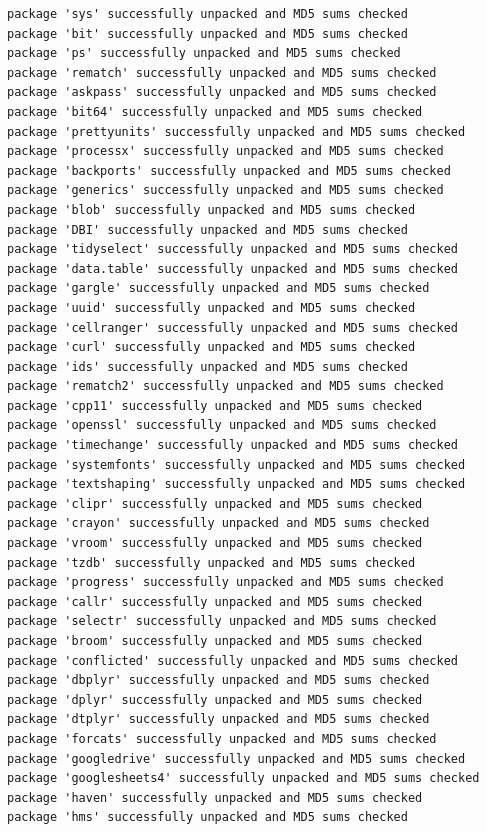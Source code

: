 \documentclass[
  11pt,
]{article}
\begin{document}
\begin{verbatim}
package 'sys' successfully unpacked and MD5 sums checked
package 'bit' successfully unpacked and MD5 sums checked
package 'ps' successfully unpacked and MD5 sums checked
package 'rematch' successfully unpacked and MD5 sums checked
package 'askpass' successfully unpacked and MD5 sums checked
package 'bit64' successfully unpacked and MD5 sums checked
package 'prettyunits' successfully unpacked and MD5 sums checked
package 'processx' successfully unpacked and MD5 sums checked
package 'backports' successfully unpacked and MD5 sums checked
package 'generics' successfully unpacked and MD5 sums checked
package 'blob' successfully unpacked and MD5 sums checked
package 'DBI' successfully unpacked and MD5 sums checked
package 'tidyselect' successfully unpacked and MD5 sums checked
package 'data.table' successfully unpacked and MD5 sums checked
package 'gargle' successfully unpacked and MD5 sums checked
package 'uuid' successfully unpacked and MD5 sums checked
package 'cellranger' successfully unpacked and MD5 sums checked
package 'curl' successfully unpacked and MD5 sums checked
package 'ids' successfully unpacked and MD5 sums checked
package 'rematch2' successfully unpacked and MD5 sums checked
package 'cpp11' successfully unpacked and MD5 sums checked
package 'openssl' successfully unpacked and MD5 sums checked
package 'timechange' successfully unpacked and MD5 sums checked
package 'systemfonts' successfully unpacked and MD5 sums checked
package 'textshaping' successfully unpacked and MD5 sums checked
package 'clipr' successfully unpacked and MD5 sums checked
package 'crayon' successfully unpacked and MD5 sums checked
package 'vroom' successfully unpacked and MD5 sums checked
package 'tzdb' successfully unpacked and MD5 sums checked
package 'progress' successfully unpacked and MD5 sums checked
package 'callr' successfully unpacked and MD5 sums checked
package 'selectr' successfully unpacked and MD5 sums checked
package 'broom' successfully unpacked and MD5 sums checked
package 'conflicted' successfully unpacked and MD5 sums checked
package 'dbplyr' successfully unpacked and MD5 sums checked
package 'dplyr' successfully unpacked and MD5 sums checked
package 'dtplyr' successfully unpacked and MD5 sums checked
package 'forcats' successfully unpacked and MD5 sums checked
package 'googledrive' successfully unpacked and MD5 sums checked
package 'googlesheets4' successfully unpacked and MD5 sums checked
package 'haven' successfully unpacked and MD5 sums checked
package 'hms' successfully unpacked and MD5 sums checked

\end{verbatim}
\end{document}
